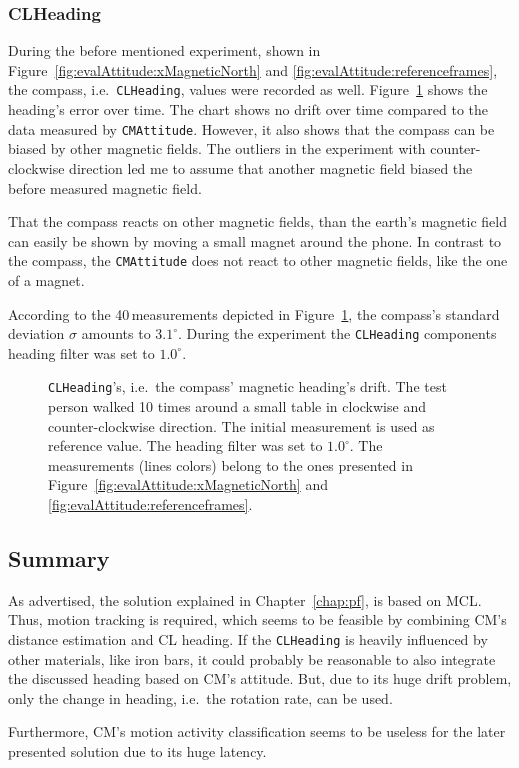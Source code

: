 \subsubsection*{CLHeading}
During the before mentioned experiment, shown in Figure~\ref{fig:evalAttitude:xMagneticNorth} and \ref{fig:evalAttitude:referenceframes}, the compass, i.e.\ \texttt{CLHeading}, values were recorded as well. Figure~\ref{fig:eval:compass} shows the heading's error over time. The chart shows no drift over time compared to the data measured by \texttt{CMAttitude}. However, it also shows that the compass can be biased by other magnetic fields. The outliers in the experiment with counter-clockwise direction led me to assume that another magnetic field biased the before measured magnetic field.

That the compass reacts on other magnetic fields, than the earth's magnetic field can easily be shown by moving a small magnet around the phone. In contrast to the compass, the \texttt{CMAttitude} does not react to other magnetic fields, like the one of a magnet.

According to the 40\,measurements depicted in Figure~\ref{fig:eval:compass}, the compass's standard deviation $\sigma$ amounts to $3.1^{\circ}$. During the experiment the \texttt{CLHeading} components heading filter was set to $1.0^{\circ}$.


\begin{figure}
	
	\caption{\texttt{CLHeading}'s, i.e.\ the compass' magnetic heading's drift. The test person walked 10 times around a small table in clockwise and counter-clockwise direction. The initial measurement is used as reference value. The heading filter was set to $1.0^{\circ}$. The measurements (lines colors) belong to the ones presented in Figure~\ref{fig:evalAttitude:xMagneticNorth} and \ref{fig:evalAttitude:referenceframes}.}
	\label{fig:eval:compass}
\end{figure}

\subsection{Summary}
As advertised, the solution explained in Chapter~\ref{chap:pf}, is based on \ac{MCL}. Thus, motion tracking is required, which seems to be feasible by combining \ac{CM}'s distance estimation and \ac{CL} heading. If the \texttt{CLHeading} is heavily influenced by other materials, like iron bars, it could probably be reasonable to also integrate the discussed heading based on \ac{CM}'s attitude. But, due to its huge drift problem, only the change in heading, i.e.\ the rotation rate, can be used.

Furthermore, \ac{CM}'s motion activity classification seems to be useless for the later presented solution due to its huge latency.
